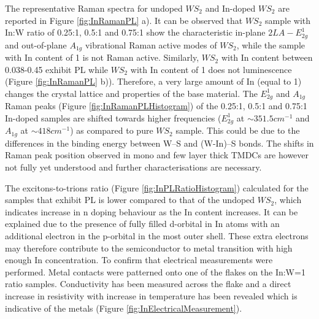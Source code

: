 The representative Raman spectra for undoped $WS_2$ and In-doped $WS_2$ are reported in Figure \ref{fig:InRamanPL} a). It can be observed that $WS_2$ sample with In:W ratio of 0.25:1, 0.5:1 and 0.75:1 show the characteristic in-plane $2LA-E^1_{2g}$ and out-of-plane $A_{1g}$ vibrational Raman active modes of $WS_2$, while the sample with In content of 1 is not Raman active. Similarly, $WS_2$ with In content between 0.038-0.45 exhibit PL while $WS_2$ with In content of 1 does not luminescence (Figure \ref{fig:InRamanPL} b)). Therefore, a very large amount of In (equal to 1) changes the crystal lattice and properties of the base material. The $E^1_{2g}$ and $A_{1g}$ Raman peaks (Figure \ref{fig:InRamanPLHistogram}) of the 0.25:1, 0.5:1 and 0.75:1 In-doped samples are shifted towards higher frequencies ($E^1_{2g}$ at $\sim 351.5 cm^{-1}$ and $A_{1g}$ at $\sim 418 cm^{-1}$) as compared to pure $WS_2$ sample. This could be due to the differences in the binding energy between W–S and (W-In)–S bonds. The shifts in Raman peak position observed in mono and few layer thick TMDCs are however not fully yet understood and further characterisations are necessary. 

The excitons-to-trions ratio (Figure \ref{fig:InPLRatioHistogram}) calculated for the samples that exhibit PL is lower compared to that of the undoped $WS_2$, which indicates increase in n doping behaviour as the In content increases. It can be explained due to the presence of fully filled d-orbital in In atoms with an additional electron in the p-orbital in the most outer shell. These extra electrons may therefore contribute to the semiconductor to metal transition with high enough In concentration. To confirm that electrical measurements were performed. Metal contacts were patterned onto one of the flakes on the In:W=1 ratio samples. Conductivity has been measured across the flake and a direct increase in resistivity with increase in temperature has been revealed which is indicative of the metals (Figure \ref{fig:InElectricalMeasurement}).

